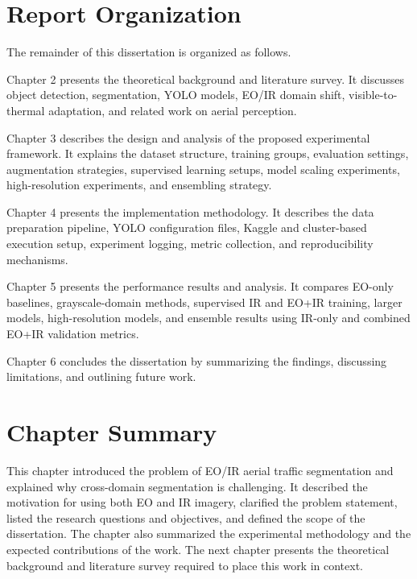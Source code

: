 \section{Report Organization}

The remainder of this dissertation is organized as follows.

Chapter 2 presents the theoretical background and literature survey. It discusses object detection, segmentation, YOLO models, EO/IR domain shift, visible-to-thermal adaptation, and related work on aerial perception.

Chapter 3 describes the design and analysis of the proposed experimental framework. It explains the dataset structure, training groups, evaluation settings, augmentation strategies, supervised learning setups, model scaling experiments, high-resolution experiments, and ensembling strategy.

Chapter 4 presents the implementation methodology. It describes the data preparation pipeline, YOLO configuration files, Kaggle and cluster-based execution setup, experiment logging, metric collection, and reproducibility mechanisms.

Chapter 5 presents the performance results and analysis. It compares EO-only baselines, grayscale-domain methods, supervised IR and EO+IR training, larger models, high-resolution models, and ensemble results using IR-only and combined EO+IR validation metrics.

Chapter 6 concludes the dissertation by summarizing the findings, discussing limitations, and outlining future work.

\section{Chapter Summary}

This chapter introduced the problem of EO/IR aerial traffic segmentation and explained why cross-domain segmentation is challenging. It described the motivation for using both EO and IR imagery, clarified the problem statement, listed the research questions and objectives, and defined the scope of the dissertation. The chapter also summarized the experimental methodology and the expected contributions of the work. The next chapter presents the theoretical background and literature survey required to place this work in context.


